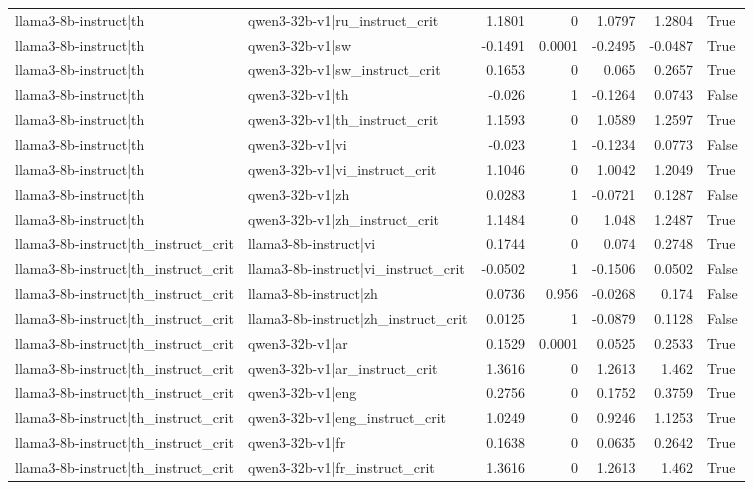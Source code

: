 \begin{table}
\begin{tabular}{l l r r r r l}
llama3-8b-instruct|th & qwen3-32b-v1|ru_instruct_crit & 1.1801 & 0 & 1.0797 & 1.2804 & True \\
llama3-8b-instruct|th & qwen3-32b-v1|sw & -0.1491 & 0.0001 & -0.2495 & -0.0487 & True \\
llama3-8b-instruct|th & qwen3-32b-v1|sw_instruct_crit & 0.1653 & 0 & 0.065 & 0.2657 & True \\
llama3-8b-instruct|th & qwen3-32b-v1|th & -0.026 & 1 & -0.1264 & 0.0743 & False \\
llama3-8b-instruct|th & qwen3-32b-v1|th_instruct_crit & 1.1593 & 0 & 1.0589 & 1.2597 & True \\
llama3-8b-instruct|th & qwen3-32b-v1|vi & -0.023 & 1 & -0.1234 & 0.0773 & False \\
llama3-8b-instruct|th & qwen3-32b-v1|vi_instruct_crit & 1.1046 & 0 & 1.0042 & 1.2049 & True \\
llama3-8b-instruct|th & qwen3-32b-v1|zh & 0.0283 & 1 & -0.0721 & 0.1287 & False \\
llama3-8b-instruct|th & qwen3-32b-v1|zh_instruct_crit & 1.1484 & 0 & 1.048 & 1.2487 & True \\
llama3-8b-instruct|th_instruct_crit & llama3-8b-instruct|vi & 0.1744 & 0 & 0.074 & 0.2748 & True \\
llama3-8b-instruct|th_instruct_crit & llama3-8b-instruct|vi_instruct_crit & -0.0502 & 1 & -0.1506 & 0.0502 & False \\
llama3-8b-instruct|th_instruct_crit & llama3-8b-instruct|zh & 0.0736 & 0.956 & -0.0268 & 0.174 & False \\
llama3-8b-instruct|th_instruct_crit & llama3-8b-instruct|zh_instruct_crit & 0.0125 & 1 & -0.0879 & 0.1128 & False \\
llama3-8b-instruct|th_instruct_crit & qwen3-32b-v1|ar & 0.1529 & 0.0001 & 0.0525 & 0.2533 & True \\
llama3-8b-instruct|th_instruct_crit & qwen3-32b-v1|ar_instruct_crit & 1.3616 & 0 & 1.2613 & 1.462 & True \\
llama3-8b-instruct|th_instruct_crit & qwen3-32b-v1|eng & 0.2756 & 0 & 0.1752 & 0.3759 & True \\
llama3-8b-instruct|th_instruct_crit & qwen3-32b-v1|eng_instruct_crit & 1.0249 & 0 & 0.9246 & 1.1253 & True \\
llama3-8b-instruct|th_instruct_crit & qwen3-32b-v1|fr & 0.1638 & 0 & 0.0635 & 0.2642 & True \\
llama3-8b-instruct|th_instruct_crit & qwen3-32b-v1|fr_instruct_crit & 1.3616 & 0 & 1.2613 & 1.462 & True \\

\end{tabular}
\end{table}
